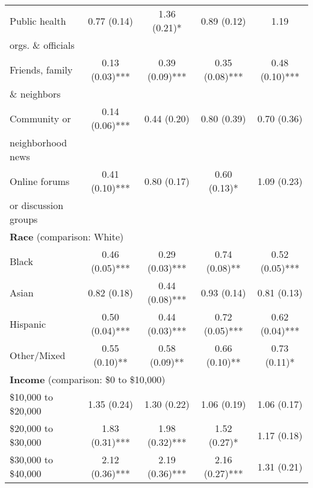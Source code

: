 \documentclass[11pt]{article}
\begin{document}
\begin{landscape}
\begin{table}
\begin{tabular}{l|c|c|c|c}
      \enspace Public health         &  0.77 (0.14)       & 1.36 (0.21)*       &  0.89 (0.12)      & 1.19       \\
      \enspace orgs. \& officials    &                    &                    &                   &       \\
      \enspace Friends, family       &  0.13 (0.03)***    & 0.39 (0.09)***     &  0.35 (0.08)***   & 0.48 (0.10)***   \\
      \enspace \& neighbors          &                    &                    &                   &       \\
      \enspace Community or          &  0.14 (0.06)***    & 0.44 (0.20)        &  0.80 (0.39)      & 0.70 (0.36)         \\
      \enspace neighborhood news     &                    &                    &                   &       \\
      \enspace Online forums         &  0.41 (0.10)***    & 0.80 (0.17)        &  0.60 (0.13)*     & 1.09 (0.23)        \\
      \enspace or discussion groups  &                    &                    &                   &      \\
    \multicolumn{5}{l}{{\bf Race} (comparison: White)}   \\
      \enspace Black                 &  0.46 (0.05)***    & 0.29 (0.03)***     &  0.74 (0.08)**    & 0.52 (0.05)***   \\
      \enspace Asian                 &  0.82 (0.18)       & 0.44 (0.08)***     &  0.93 (0.14)      & 0.81 (0.13)          \\
      \enspace Hispanic              &  0.50 (0.04)***    & 0.44 (0.03)***     &  0.72 (0.05)***   & 0.62 (0.04)***    \\
      \enspace Other/Mixed           &  0.55 (0.10)**     & 0.58 (0.09)**      &  0.66 (0.10)**    & 0.73 (0.11)*       \\
    \multicolumn{5}{l}{{\bf Income} (comparison: \$0 to \$10,000)}   \\
      \enspace \$10,000 to \$20,000  & 1.35 (0.24)        & 1.30 (0.22)        &  1.06 (0.19)      & 1.06 (0.17)         \\
      \enspace \$20,000 to \$30,000  & 1.83 (0.31)***     & 1.98 (0.32)***     &  1.52 (0.27)*     & 1.17 (0.18)          \\
      \enspace \$30,000 to \$40,000  & 2.12 (0.36)***     & 2.19 (0.36)***     &  2.16 (0.27)***   & 1.31 (0.21)           \\

\end{tabular}
\end{table}
\end{landscape}
\end{document}
